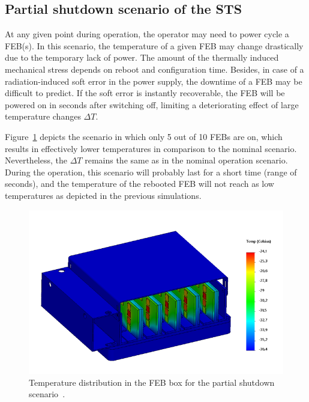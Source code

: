 \subsection{Partial shutdown scenario of the STS}
\label{reboot}

At any given point during operation, the operator may need to power cycle a \gls{FEB}(s). In this scenario, the temperature of a given \gls{FEB} may change drastically due to the temporary lack of power. The amount of the thermally induced mechanical stress depends on reboot and configuration time. Besides, in case of a radiation-induced soft error in the power supply, the downtime of a \gls{FEB} may be difficult to predict. If the soft error is instantly recoverable, the FEB will be powered on in seconds after switching off, limiting a deteriorating effect of large temperature changes $\Delta T$.

Figure~\ref{fig_reboot_box} depicts the scenario in which only 5 out of 10 \glspl{FEB} are on, which results in effectively lower temperatures in comparison to the nominal scenario. Nevertheless, the $\Delta T$ remains the same as in the nominal operation scenario. During the operation, this scenario will probably last for a short time (range of seconds), and the temperature of the rebooted \gls{FEB} will not reach as low temperatures as depicted in the previous simulations.



\begin{figure}[!h]
\centering
\includegraphics[width=0.6\columnwidth]{Chapter4/images/reboot_box.png}
\caption{Temperature distribution in the \gls{FEB} box for the partial shutdown scenario~\cite{Agarwal}.}
\label{fig_reboot_box}
\end{figure}

